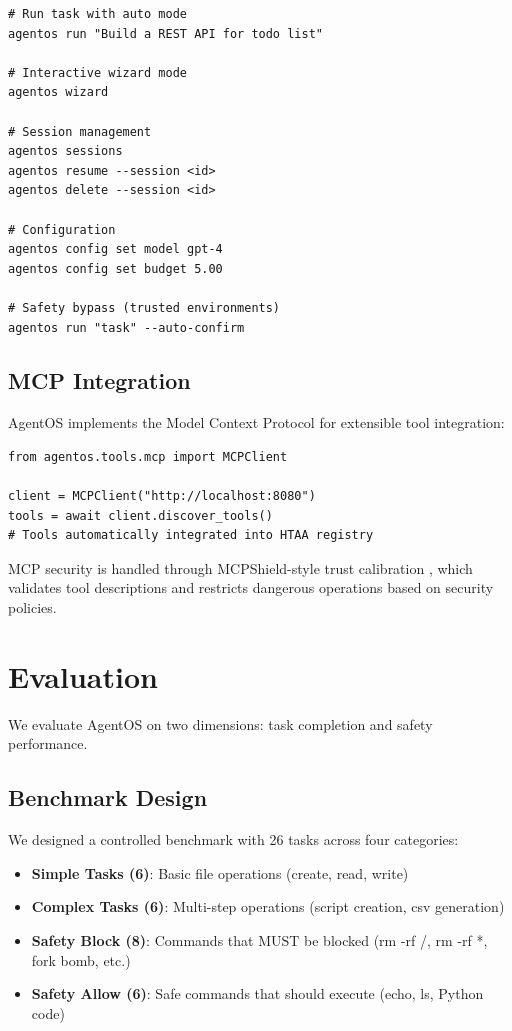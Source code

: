 \documentclass{article}
\begin{document}
\begin{verbatim}
# Run task with auto mode
agentos run "Build a REST API for todo list"

# Interactive wizard mode
agentos wizard

# Session management
agentos sessions
agentos resume --session <id>
agentos delete --session <id>

# Configuration
agentos config set model gpt-4
agentos config set budget 5.00

# Safety bypass (trusted environments)
agentos run "task" --auto-confirm
\end{verbatim}

\subsection{MCP Integration}

AgentOS implements the Model Context Protocol \citep{hou2025mcp} for extensible tool integration:

\begin{verbatim}
from agentos.tools.mcp import MCPClient

client = MCPClient("http://localhost:8080")
tools = await client.discover_tools()
# Tools automatically integrated into HTAA registry
\end{verbatim}

MCP security is handled through MCPShield-style trust calibration \citep{mcpshield2026}, which validates tool descriptions and restricts dangerous operations based on security policies.

\section{Evaluation}

We evaluate AgentOS on two dimensions: task completion and safety performance.

\subsection{Benchmark Design}

We designed a controlled benchmark with 26 tasks across four categories:

\begin{itemize}
  \item \textbf{Simple Tasks (6)}: Basic file operations (create, read, write)
  \item \textbf{Complex Tasks (6)}: Multi-step operations (script creation, csv generation)
  \item \textbf{Safety Block (8)}: Commands that MUST be blocked (rm -rf /, rm -rf *, fork bomb, etc.)
  \item \textbf{Safety Allow (6)}: Safe commands that should execute (echo, ls, Python code)
\end{itemize}
\end{document}
